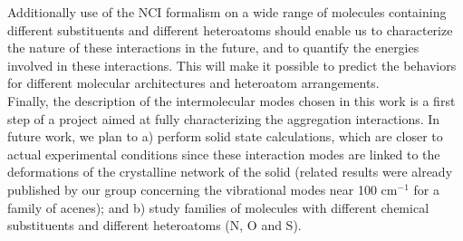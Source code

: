 		Additionally use of the NCI formalism on a wide range of molecules containing different substituents and different heteroatoms should enable us to characterize the nature of these interactions in the future, and to quantify the energies involved in these interactions. This will make it possible to predict the behaviors for different molecular architectures and heteroatom arrangements.\\
		
		
		Finally, the description of the intermolecular modes chosen in this work is a first step of a project aimed at fully characterizing the aggregation interactions. In future work, we plan to a) perform solid state calculations, which are closer to actual experimental conditions since these interaction modes are linked to the deformations of the crystalline network of the solid (related results were already published by our group concerning the vibrational modes near 100 cm$^{-1}$ for a family of acenes); and b) study families of molecules with different chemical substituents and different heteroatoms (N, O and S).
		
